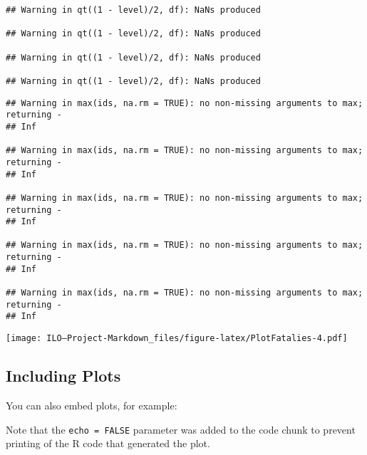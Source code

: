 \documentclass[
]{article}
\begin{document}
\begin{verbatim}
## Warning in qt((1 - level)/2, df): NaNs produced

## Warning in qt((1 - level)/2, df): NaNs produced

## Warning in qt((1 - level)/2, df): NaNs produced

## Warning in qt((1 - level)/2, df): NaNs produced
\end{verbatim}

\begin{verbatim}
## Warning in max(ids, na.rm = TRUE): no non-missing arguments to max; returning -
## Inf

## Warning in max(ids, na.rm = TRUE): no non-missing arguments to max; returning -
## Inf

## Warning in max(ids, na.rm = TRUE): no non-missing arguments to max; returning -
## Inf

## Warning in max(ids, na.rm = TRUE): no non-missing arguments to max; returning -
## Inf

## Warning in max(ids, na.rm = TRUE): no non-missing arguments to max; returning -
## Inf
\end{verbatim}

\texttt{[image: ILO---Project-Markdown\_files/figure-latex/PlotFatalies-4.pdf]}

\hypertarget{including-plots}{%
\subsection{Including Plots}\label{including-plots}}

You can also embed plots, for example:

Note that the \texttt{echo\ =\ FALSE} parameter was added to the code
chunk to prevent printing of the R code that generated the plot.
\end{document}
